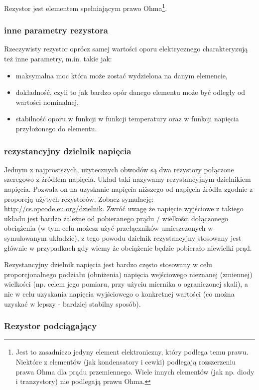 Rezystor jest elementem spełniającym prawo Ohma\footnote{Jest to zasadniczo jedyny element elektroniczny, który podlega temu prawu. Niektóre z elementów (jak kondensatory i cewki) podlegają rozszerzeniu prawa Ohma dla prądu przemiennego. Wiele innych elementów (jak np. diody i tranzystory) nie podlegają prawu Ohma.}.

\subsubsection{inne parametry rezystora}
Rzeczywisty rezystor oprócz samej wartości oporu elektrycznego charakteryzują też inne parametry, m.in. takie jak:
\begin{itemize}
\item maksymalna moc która może zostać wydzielona na danym elemencie,
\item dokładność, czyli to jak bardzo opór danego elementu może być odległy od wartości nominalnej,
\item stabilność oporu w funkcji w funkcji temperatury oraz w funkcji napięcia przyłożonego do elementu.
\end{itemize}

\subsubsection{rezystancyjny dzielnik napięcia}\label{dzielnik}

Jednym z najprostszych, użytecznych obwodów są dwa rezystory połączone szeregowo z źródłem napięcia. Układ taki nazywamy rezystancyjnym dzielnikiem napięcia. Pozwala on na uzyskanie napięcia niższego od napięcia źródła zgodnie z proporcją użytych rezystorów. Zobacz symulację: \url{http://cs.opcode.eu.org/dzielnik}.
Zwróć uwagę że napięcie wyjściowe z takiego układu jest bardzo zależne od pobieranego prądu / wielkości dołączonego obciążenia (w tym celu możesz użyć przełączników umieszczonych w symulowanym układzie), z tego powodu dzielnik rezystancyjny stosowany jest głównie w przypadkach gdy wiemy że obciążenie będzie pobierało niewielki prąd.

Rezystancyjny dzielnik napięcia jest bardzo często stosowany w celu proporcjonalnego podziału (obniżenia) napięcia wejściowego nieznanej (zmiennej) wielkości (np. celem jego pomiaru, przy użyciu miernika o ograniczonej skali),
a nie w celu uzyskania napięcia wyjściowego o konkretnej wartości (co można uzyskać w lepszy - bardziej stabilny sposób).

\subsubsection{Rezystor podciągający}

